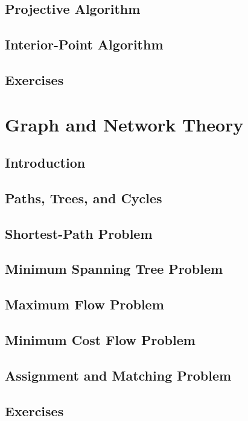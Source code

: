 \documentclass[10pt]{book}
\begin{document}
	\chapter{Projective Algorithm}

	\chapter{Interior-Point Algorithm}

	\chapter{Exercises}

\part{Graph and Network Theory}
	\chapter{Introduction}

	\chapter{Paths, Trees, and Cycles}

	\chapter{Shortest-Path Problem}

	\chapter{Minimum Spanning Tree Problem}

	\chapter{Maximum Flow Problem}

	\chapter{Minimum Cost Flow Problem}

	\chapter{Assignment and Matching Problem}

	\chapter{Exercises}
\end{document}
